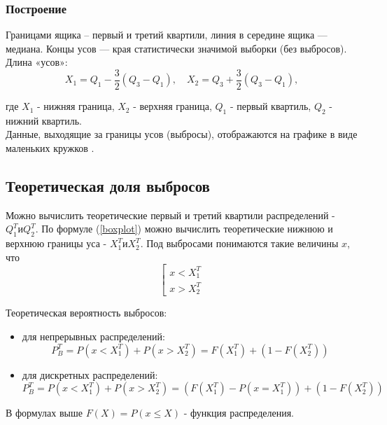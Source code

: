 \documentclass[12pt,a4paper]{article}
\begin{document}
			\subsubsection{Построение}
				Границами ящика – первый и третий квартили, линия в середине ящика —
				медиана. Концы усов — края статистически значимой выборки (без выбросов). Длина «усов»:
				\begin{equation}\label{boxplot}
					X_1=Q_1 - \frac{3}{2}(Q_3-Q_1), \quad X_2=Q_3+\frac{3}{2}(Q_3-Q_1),
				\end{equation}
	
				где $X_1$ - нижняя граница, $X_2$ - верхняя граница, $Q_1$ - первый квартиль, $Q_2$ - нижний квартиль.\\
				Данные, выходящие за границы усов (выбросы), отображаются на графике
				в виде маленьких кружков \cite{boxplot_ref}.
				
		\subsection{Теоретическая доля выбросов}
			Можно вычислить теоретические первый и третий квартили распределений - $Q^{T}_{1} и Q^{T}_{2}$. По формуле (\ref{boxplot}) можно вычислить теоретические нижнюю и верхнюю границы уса - $X^{T}_{1} и X^{T}_{2}$. Под выбросами понимаются такие величины $x$, что
			\begin{equation}
				\left[
					\begin{array}{l}
						x < X^{T}_{1} \\
						x > X^{T}_{2}
					\end{array}
				\right.
			\end{equation}
	
			Теоретическая вероятность выбросов:
			\begin{itemize}
				\item для непрерывных распределений:
				\begin{equation}
					P^{T}_{B} = P(x<X^{T}_{1}) + P(x>X^{T}_{2})=F(X^{T}_{1}) + (1-F(X^{T}_{2}))
				\end{equation}
			
				\item для дискретных распределений:
				\begin{equation}
					P^{T}_{B} = P(x<X^{T}_{1}) + P(x>X^{T}_{2})=(F(X^{T}_{1})-P(x=X^{T}_{1})) + (1-F(X^{T}_{2}))
				\end{equation}
			\end{itemize}
			В формулах выше $F(X) = P(x \leq X)$ - функция распределения.
\end{document}
